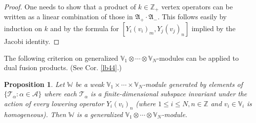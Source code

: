 \documentclass[11pt,b5paper,notitlepage]{article}
\theoremstyle{definition}
\theoremstyle{plain}
\newtheorem{pp}[df]{Proposition}
\newcommand{\fk}{\mathfrak}
\newcommand{\mc}{\mathcal}
\newcommand{\Vbb}{\mathbb V}
\newcommand{\Wbb}{\mathbb W}
\newcommand{\Zbb}{\mathbb Z}
\newcommand{\<}{\left\langle}
\renewcommand{\>}{\right\rangle}
\numberwithin{equation}{subsection}
\begin{document}
\begin{proof}
One needs to show that a product of $k\in\Zbb_+$ vertex operators can be written as a linear combination of those in $\fk A_+\cdot\fk A_-$. This follows easily by induction on $k$ and by the formula for $[Y_i(v_i)_m,Y_j(v_j)_n]$ implied by the Jacobi identity.
\end{proof}

The following criterion on generalized $\Vbb_1\otimes\cdots\otimes\Vbb_N$-modules can be applied to dual fusion products. (See Cor. \ref{lb44}.)   %


\begin{pp}\label{lb42}
Let $\Wbb$ be a weak $\Vbb_1\times\cdots\times\Vbb_N$-module generated by elements of $\{\mc T_\alpha:\alpha\in\mc A\}$ where each $\mc T_\alpha$ is a finite-dimensional subspace invariant under the action of every lowering operator $Y_i(v_i)_n$ (where $1\leq i\leq N,n\in\Zbb$ and $v_i\in\Vbb_i$ is homogeneous). Then $\Wbb$ is a generalized $\Vbb_1\otimes\cdots\otimes\Vbb_N$-module.
\end{pp}
\end{document}
